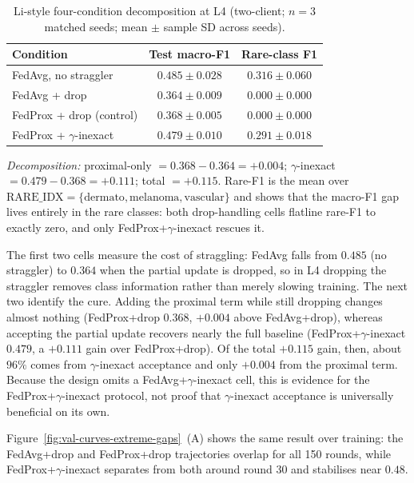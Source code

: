 \documentclass[11pt,a4paper]{report}
\begin{document}
\begin{table}[H]
\centering
\caption{Li-style four-condition decomposition at L4 (two-client; $n=3$
matched seeds; mean $\pm$ sample SD across seeds).}
\label{tab:li-decomp-l4}
\small
\begin{tabular}{lcc}
\toprule
Condition                                       & Test macro-F1                & Rare-class F1 \\
\midrule
FedAvg, no straggler                            & $0.485 \pm 0.028$            & $0.316 \pm 0.060$ \\
FedAvg + drop                                   & $0.364 \pm 0.009$            & $0.000 \pm 0.000$ \\
FedProx + drop (control)                        & $0.368 \pm 0.005$            & $0.000 \pm 0.000$ \\
FedProx + $\gamma$-inexact                      & $\mathbf{0.479 \pm 0.010}$   & $\mathbf{0.291 \pm 0.018}$ \\
\bottomrule
\end{tabular}

\smallskip
\noindent\textit{Decomposition:} proximal-only $= 0.368 - 0.364 = +0.004$;
$\gamma$-inexact $= 0.479 - 0.368 = +0.111$; total $= +0.115$. Rare-F1 is
the mean over $\mathrm{RARE\_IDX} = \{\text{dermato}, \text{melanoma},
\text{vascular}\}$ and shows that the macro-F1 gap lives entirely in the
rare classes: both drop-handling cells flatline rare-F1 to exactly zero,
and only FedProx+$\gamma$-inexact rescues it.
\end{table}

The first two cells measure the cost of straggling: FedAvg falls from $0.485$
(no straggler) to $0.364$ when the partial update is dropped, so in L4 dropping
the straggler removes class information rather than merely slowing training. The
next two identify the cure. Adding the proximal term while still dropping changes
almost nothing (FedProx+drop $0.368$, $+0.004$ above FedAvg+drop), whereas
accepting the partial update recovers nearly the full baseline
(FedProx+$\gamma$-inexact $0.479$, a $+0.111$ gain over FedProx+drop). Of the
total $+0.115$ gain, then, about $96\%$ comes from $\gamma$-inexact acceptance and
only $+0.004$ from the proximal term. Because the design omits a
FedAvg+$\gamma$-inexact cell, this is evidence for the FedProx+$\gamma$-inexact
protocol, not proof that $\gamma$-inexact acceptance is universally beneficial on
its own.

Figure~\ref{fig:val-curves-extreme-gaps}~(A) shows the same result over
training: the FedAvg+drop and FedProx+drop trajectories overlap for all 150
rounds, while FedProx+$\gamma$-inexact separates from both around round 30 and
stabilises near $0.48$.
\end{document}
